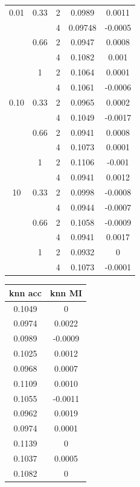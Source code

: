 \documentclass[./dissertation.tex]{subfiles}
\begin{document}
\begin{table}[]
\begin{tabular}{|c|c|c|c|c|}
            \hline
             0.01 & 0.33 & 2 & 0.0989 & 0.0011 \\
             &  & 4 & 0.09748 & -0.0005  \\
             & 0.66 & 2 & 0.0947 & 0.0008 \\
             &  & 4 & 0.1082 & 0.001   \\
             & 1 & 2 & 0.1064 & 0.0001  \\
             &  & 4 & 0.1061 & -0.0006  \\
             0.10 & 0.33 & 2 & 0.0965 & 0.0002  \\
             &  & 4 & 0.1049 & -0.0017 \\
             & 0.66 & 2 & 0.0941 & 0.0008 \\
             &  & 4 & 0.1073 & 0.0001 \\
             & 1 & 2 & 0.1106 & -0.001 \\
             &  & 4 & 0.0941 & 0.0012 \\
             10 & 0.33 & 2 & 0.0998 & -0.0008 \\
             &  & 4 & 0.0944 & -0.0007 \\
             & 0.66 & 2 & 0.1058 & -0.0009 \\
             &  & 4 & 0.0941 & 0.0017 \\
             & 1 & 2 & 0.0932 & 0  \\
             &  & 4 & 0.1073 & -0.0001 \\
            \hline
       \end{tabular}
       \begin{tabular}{|c|c|}
            \hline
            \textbf{knn acc} & \textbf{knn MI}  \\
            \hline
            0.1049 & 0 \\
            0.0974 & 0.0022  \\
            0.0989 & -0.0009 \\
            0.1025 & 0.0012 \\
            0.0968 & 0.0007  \\
            0.1109 & 0.0010  \\
            0.1055 & -0.0011  \\
            0.0962 & 0.0019 \\
            0.0974 & 0.0001  \\
            0.1139 & 0 \\
            0.1037 & 0.0005  \\
            0.1082 & 0  \\

\end{tabular}
\end{table}
\end{document}
